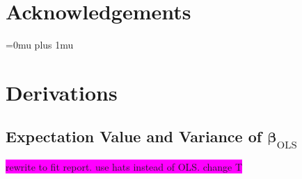 \documentclass[aps,pra,english,notitlepage,reprint,nofootinbib]{revtex4-1}  %
\begin{document}
\section*{Acknowledgements}\label{sec:cknowledgements}

\Urlmuskip=0mu plus 1mu\relax
\onecolumngrid


\newpage
\appendix
\section{Derivations}\label{appsec:derivations}
\subsection{Expectation Value and Variance of \texorpdfstring{$\boldsymbol{\beta}_\text{OLS}$}{Lg}}\label{subapp:beta OLS}
\colorbox{magenta}{rewrite to fit report. use hats instead of OLS. change T}
\end{document}
